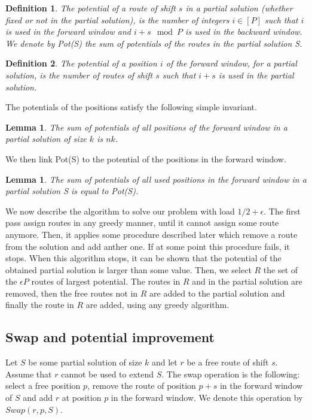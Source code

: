 \documentclass[10pt, conference, letterpaper]{IEEEtran}
\newtheorem{lemma}[theorem]{Lemma}
\newtheorem{definition}{Definition}
\begin{document}
\begin{definition}
The potential of a route of shift $s$ in a partial solution (whether fixed or not in the partial solution),
is the number of integers $i \in [P]$ such that $i$ is used in the forward window and $i+s \mod P$ is used in the backward window. We denote by Pot(S) the sum of potentials of the routes in the partial solution S.
\end{definition} 


\begin{definition}
The potential of a position $i$ of the forward window, for a partial solution, is the number of routes of shift $s$ such that $i+s$ is used in the partial solution. 
\end{definition}

The potentials of the positions satisfy the following simple invariant.
\begin{lemma}\label{lemma:inv}
The sum of potentials of all positions of the forward window in a partial solution of size $k$ is $nk$.  
\end{lemma}

We then link Pot(S) to the potential of the positions in the forward window.
\begin{lemma}\label{lemma:pot_pos}
The sum of potentials of all used positions in the forward window in a partial solution S is equal to Pot(S).  
\end{lemma}
 

We now describe the algorithm to solve our problem with load $1/2 + \epsilon$. The first pass assign routes in any
greedy manner, until it cannot assign some route anymore. Then, it applies some procedure described later which 
remove a route from the solution and add anther one. If at some point this procedure fails, it stops.
When this algorithm stops, it can be shown that the potential of the obtained partial solution is larger
than some value. Then, we select $R$ the set of the $\epsilon P$ routes of largest potential. The routes in $R$ and in the partial solution are removed, then the free routes not in $R$ are added to the partial solution and 
finally the route in $R$ are added, using any greedy algorithm.

\subsection{Swap and potential improvement}


Let $S$ be some partial solution of size $k$ and let $r$ be a free route of shift $s$. 
Assume that $r$ cannot be used to extend $S$. The swap operation is the following: 
select a free position $p$, remove the route of position $p+s$ in the forward window 
of $S$ and add $r$ at position $p$ in the forward window. We denote this operation by $Swap(r,p,S)$.
\end{document}
